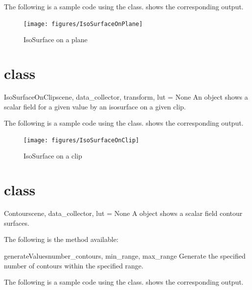 The following is a sample code using the \IsoSurfaceOnPlane class.
 shows the corresponding output.


\begin{figure}[ht]
\begin{center}
\texttt{[image: figures/IsoSurfaceOnPlane]}
\end{center}
\caption{IsoSurface on a plane}
\label{fig:isosurfaceonplane.1}
\end{figure}

\section{\IsoSurfaceOnClip class}
\begin{classdesc}{IsoSurfaceOnClip}{scene, data_collector, transform, 
lut = None}
An \IsoSurfaceOnClip object shows a scalar field for a given value 
by an isosurface on a given clip.
\end{classdesc}

The following is a sample code using the \IsoSurfaceOnClip class.
 shows the corresponding output.


\begin{figure}[ht]
\begin{center}
\texttt{[image: figures/IsoSurfaceOnClip]}
\end{center}
\caption{IsoSurface on a clip}
\label{fig:isosurfaceonclip.1}
\end{figure}

\section{\Contour class}
\begin{classdesc}{Contour}{scene, data_collector, lut = None}
A \Contour object shows a scalar field contour surfaces.
\end{classdesc}

The following is the method available:
\begin{methoddesc}[Contour]{generateValues}{number_contours, min_range,
max_range}
Generate the specified number of contours within the specified range.
\end{methoddesc}

The following is a sample code using the \Contour class.
 shows the corresponding output.


